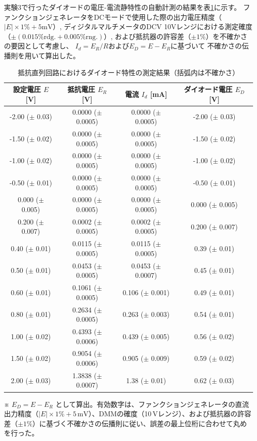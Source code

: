 実験3で行ったダイオードの電圧-電流静特性の自動計測の結果を表\ref{tab:diode_measurement_final_4col}に示す。
ファンクションジェネレータをDCモードで使用した際の出力電圧精度（$|E| \times 1\% + 5\text{mV}$）,
ディジタルマルチメータのDCV 10Vレンジにおける測定確度（$\pm(0.015\% \text{rdg.} + 0.005\% \text{rng.})$）,
および抵抗器の許容差（$\pm 1\%$）を不確かさの要因として考慮し、
$I_d = E_R/R$および$E_D = E - E_R$に基づいて
不確かさの伝播則を用いて算出した。
\begin{table}[htbp]
    \centering
    \caption{抵抗直列回路におけるダイオード特性の測定結果（括弧内は不確かさ）}
    \label{tab:diode_measurement_final_4col}
    \small
    \begin{tabular}{c|c|c|c}
        \hline\hline
        設定電圧 $E$ [V] & 抵抗電圧 $E_R$ [V] & 電流 $I_d$ [mA] & ダイオード電圧 $E_D$ [V] \\
        \hline
        -2.00 ($\pm$ 0.03)  & 0.0000 ($\pm$ 0.0005) & 0.0000 ($\pm$ 0.0005) & -2.00 ($\pm$ 0.03) \\
        -1.50 ($\pm$ 0.02)  & 0.0000 ($\pm$ 0.0005) & 0.0000 ($\pm$ 0.0005) & -1.50 ($\pm$ 0.02) \\
        -1.00 ($\pm$ 0.02)  & 0.0000 ($\pm$ 0.0005) & 0.0000 ($\pm$ 0.0005) & -1.00 ($\pm$ 0.02) \\
        -0.50 ($\pm$ 0.01)  & 0.0000 ($\pm$ 0.0005) & 0.0000 ($\pm$ 0.0005) & -0.50 ($\pm$ 0.01) \\
        0.000 ($\pm$ 0.005) & 0.0000 ($\pm$ 0.0005) & 0.0000 ($\pm$ 0.0005) & 0.000 ($\pm$ 0.005) \\
        0.200 ($\pm$ 0.007) & 0.0002 ($\pm$ 0.0005) & 0.0002 ($\pm$ 0.0005) & 0.200 ($\pm$ 0.007) \\
        0.40 ($\pm$ 0.01)   & 0.0115 ($\pm$ 0.0005) & 0.0115 ($\pm$ 0.0005) & 0.39 ($\pm$ 0.01)  \\
        0.50 ($\pm$ 0.01)   & 0.0453 ($\pm$ 0.0005) & 0.0453 ($\pm$ 0.0007) & 0.45 ($\pm$ 0.01)  \\
        0.60 ($\pm$ 0.01)   & 0.1061 ($\pm$ 0.0005) & 0.106 ($\pm$ 0.001)   & 0.49 ($\pm$ 0.01)  \\
        0.80 ($\pm$ 0.01)   & 0.2634 ($\pm$ 0.0005) & 0.263 ($\pm$ 0.003)   & 0.54 ($\pm$ 0.01)  \\
        1.00 ($\pm$ 0.02)   & 0.4393 ($\pm$ 0.0006) & 0.439 ($\pm$ 0.005)   & 0.56 ($\pm$ 0.02)  \\
        1.50 ($\pm$ 0.02)   & 0.9054 ($\pm$ 0.0006) & 0.905 ($\pm$ 0.009)   & 0.59 ($\pm$ 0.02)  \\
        2.00 ($\pm$ 0.03)   & 1.3838 ($\pm$ 0.0007) & 1.38 ($\pm$ 0.01)    & 0.62 ($\pm$ 0.03)  \\
        \hline
    \end{tabular}
    \begin{flushleft}
    \footnotesize
    ※ $E_D = E - E_R$ として算出。有効数字は、ファンクションジェネレータの直流出力精度（$|E| \times 1\% + 5\,\mathrm{mV}$）、DMMの確度（10\,Vレンジ）、および抵抗器の許容差（$\pm 1\%$）に基づく不確かさの伝播則に従い、誤差の最上位桁に合わせて丸めを行った。
    \end{flushleft}
\end{table}
